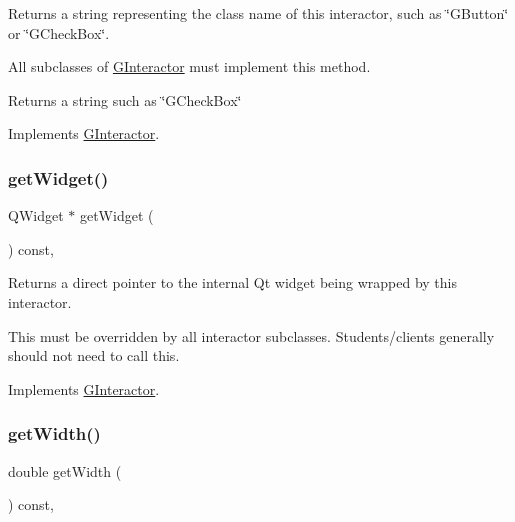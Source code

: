 Returns a string representing the class name of this interactor, such as \char`\"{}\+G\+Button\char`\"{} or \char`\"{}\+G\+Check\+Box\char`\"{}. 

All subclasses of \mbox{\hyperlink{classGInteractor}{G\+Interactor}} must implement this method. \begin{DoxyReturn}{Returns}
a string such as \char`\"{}\+G\+Check\+Box\char`\"{} 
\end{DoxyReturn}


Implements \mbox{\hyperlink{classGInteractor_a44c407a54a20dd0f2fff30338289299d}{G\+Interactor}}.

\mbox{\label{classGSpacer_a3b33a602b31a6b809d020535a59db3b4}} 
\subsubsection{\texorpdfstring{get\+Widget()}{getWidget()}}
{\footnotesize\ttfamily Q\+Widget $\ast$ get\+Widget (\begin{DoxyParamCaption}{ }\end{DoxyParamCaption}) const\hspace{0.3cm}{\ttfamily [override]}, {\ttfamily [virtual]}}



Returns a direct pointer to the internal Qt widget being wrapped by this interactor. 

This must be overridden by all interactor subclasses. Students/clients generally should not need to call this. 

Implements \mbox{\hyperlink{classGInteractor}{G\+Interactor}}.

\mbox{\label{classGInteractor_a0ed2965abd4f5701d2cadf71239faf19}} 
\subsubsection{\texorpdfstring{get\+Width()}{getWidth()}}
{\footnotesize\ttfamily double get\+Width (\begin{DoxyParamCaption}{ }\end{DoxyParamCaption}) const\hspace{0.3cm}{\ttfamily [virtual]}, {\ttfamily [inherited]}}




